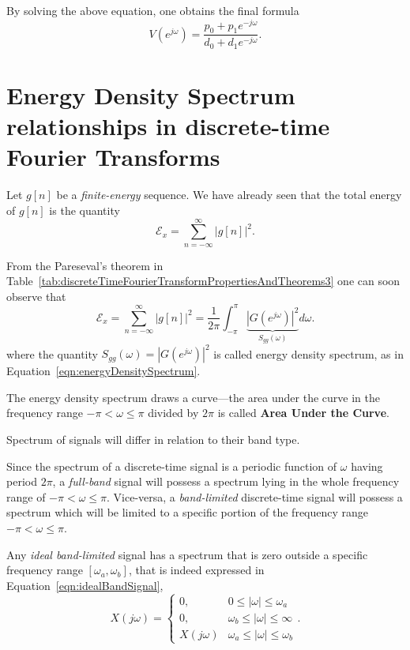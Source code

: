 \documentclass[\documentfontsize, twocolumn]{\classname}
\begin{document}
By solving the above equation, one obtains the final formula
\[
    V(e^{j\omega}) = \frac{p_0 + p_1 e^{-j\omega}}{d_0 + d_1e^{-j\omega}}.
\]

\section{Energy Density Spectrum relationships in discrete-time Fourier Transforms}

Let $g[n]$ be a \emph{finite-energy} sequence. We have already seen that the total energy of $g[n]$ is the quantity
\[
    \mathcal E_x = \sum_{n=-\infty}^\infty | g[n]|^2.
\]

From the Pareseval's theorem in Table~\ref{tab:discreteTimeFourierTransformPropertiesAndTheorems3} one can soon observe that
\begin{equation}\label{eqn:energyDensitySpectrumParseval}
    \mathcal E_x = \sum_{n=-\infty}^\infty | g[n]|^2 = \frac 1{2\pi} \int_{-\pi}^\pi \underbrace{\left|G(e^{j\omega})\right|^2}_{S_{gg}(\omega)} d\omega.
\end{equation}
where the quantity $S_{gg}(\omega) = \left|G(e^{j\omega})\right|^2$ is called energy density spectrum, as in Equation~\ref{eqn:energyDensitySpectrum}.

The energy density spectrum draws a curve---the area under the curve in the frequency range $-\pi < \omega \leq \pi$ divided by $2\pi$ is called \textbf{Area Under the Curve}.

Spectrum of signals will differ in relation to their band type.

Since the spectrum of a discrete-time signal is a periodic function of $\omega$ having period $2\pi$, a \emph{full-band} signal will possess a spectrum lying in the whole frequency range of $-\pi < \omega \leq \pi$. Vice-versa, a \emph{band-limited} discrete-time signal will possess a spectrum which will be limited to a specific portion of the frequency range $-\pi < \omega \leq \pi$.

Any \emph{ideal band-limited} signal has a spectrum that is zero outside a specific frequency range $[\omega_a, \omega_b]$, that is indeed expressed in Equation~\ref{eqn:idealBandSignal},
\[
    X(j\omega) = \left\{\begin{array}{ll}
        0,  &   0 \leq |\omega| \leq \omega_a\\
        0,  &   \omega_b \leq |\omega| \leq \infty\\
        X(j\omega)  &   \omega_a \leq |\omega| \leq \omega_b
    \end{array}\right..
\]
\end{document}
